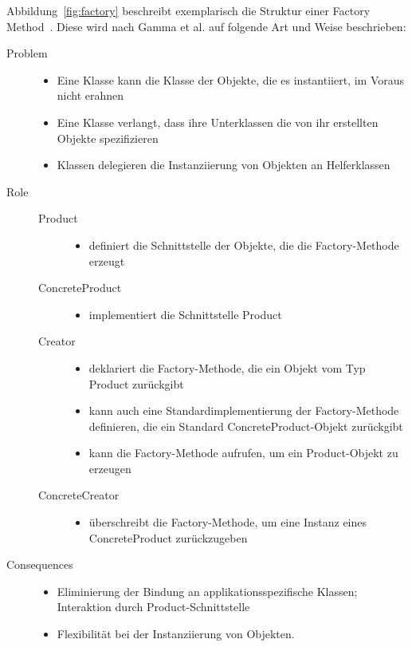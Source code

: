 Abbildung~\ref{fig:factory} beschreibt exemplarisch die Struktur einer Factory Method~\cite[S. 108]{gamma1994design}.
Diese wird nach Gamma et al. auf folgende Art und Weise beschrieben:

\begin{description}
    \item[Problem] \hfill 
    \begin{itemize}
        \item Eine Klasse kann die Klasse der Objekte, die es instantiiert, im Voraus nicht erahnen
        \item Eine Klasse verlangt, dass ihre Unterklassen die von ihr erstellten Objekte spezifizieren
        \item Klassen delegieren die Instanziierung von Objekten an Helferklassen
    \end{itemize}

    \item[Role] \hfill
    \begin{description}
        \item[Product] \hfill
        \begin{itemize}
            \item definiert die Schnittstelle der Objekte, die die Factory-Methode erzeugt
        \end{itemize}
        \item[ConcreteProduct] \hfill
        \begin{itemize}
            \item implementiert die Schnittstelle Product
        \end{itemize}
        \item[Creator] \hfill 
        \begin{itemize}
            \item deklariert die Factory-Methode, die ein Objekt vom Typ Product zurückgibt
            \item kann auch eine Standardimplementierung der Factory-Methode definieren, die ein Standard ConcreteProduct-Objekt zurückgibt
            \item kann die Factory-Methode aufrufen, um ein Product-Objekt zu erzeugen
        \end{itemize}
        \item[ConcreteCreator] \hfill
        \begin{itemize}
            \item überschreibt die Factory-Methode, um eine Instanz eines ConcreteProduct zurückzugeben
        \end{itemize}
    \end{description}

    \item[Consequences] \hfill
    \begin{itemize}
        \item Eliminierung der Bindung an applikationsspezifische Klassen; Interaktion durch Product-Schnittstelle
        \item Flexibilität bei der Instanziierung von Objekten.
    \end{itemize}

\end{description}


